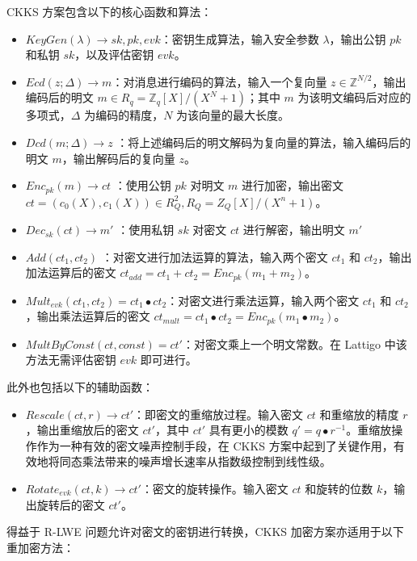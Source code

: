 CKKS 方案包含以下的核心函数和算法：

\begin{itemize}
    \item $KeyGen(\lambda) \rightarrow sk, pk, evk$：密钥生成算法，输入安全参数 $\lambda$，输出公钥 $pk$ 和私钥 $sk$，以及评估密钥 $evk$。
    \item $Ecd(z; \Delta) \rightarrow m$：对消息进行编码的算法，输入一个复向量 $z \in \mathbb{Z}^{N/2}$，输出编码后的明文 $m \in R_q = \mathbb{Z}_q[X]/(X^N+1)$；其中 $m$ 为该明文编码后对应的多项式，$\Delta$ 为编码的精度，$N$ 为该向量的最大长度。
    \item $Dcd(m; \Delta) \rightarrow z$ ：将上述编码后的明文解码为复向量的算法，输入编码后的明文 $m$，输出解码后的复向量 $z$。
    \item $Enc_{pk}(m) \rightarrow ct$ ：使用公钥 $pk$ 对明文 $m$ 进行加密，输出密文 $ct = (c_0(X),c_1(X)) \in R_Q^2, R_Q = Z_Q[X]/(X^n + 1)$。
    \item $Dec_{sk}(ct) \rightarrow m'$ ：使用私钥 $sk$ 对密文 $ct$ 进行解密，输出明文 $m'$
    \item $Add(ct_1, ct_2)$ ：对密文进行加法运算的算法，输入两个密文 $ct_1$ 和 $ct_2$，输出加法运算后的密文 $ct_{add} = ct_1 + ct_2 = Enc_{pk}(m_1 + m_2)$。
    \item $Mult_{evk}(ct_1, ct_2) = ct_1 \bullet ct_2$：对密文进行乘法运算，输入两个密文 $ct_1$ 和 $ct_2$，输出乘法运算后的密文 $ct_{mult} = ct_1 \bullet ct_2 = Enc_{pk}(m_1 \bullet m_2)$。
    \item $MultByConst(ct, const) = ct'$：对密文乘上一个明文常数。在 Lattigo 中该方法无需评估密钥 $evk$ 即可进行。\cite{lattigoRepo}
\end{itemize}

此外也包括以下的辅助函数：

\begin{itemize}
    \item $Rescale(ct, r) \rightarrow ct'$：即密文的重缩放过程。输入密文 $ct$ 和重缩放的精度 $r$，输出重缩放后的密文 $ct'$，其中 $ct'$ 具有更小的模数 $q' = q \bullet r^{-1}$。重缩放操作作为一种有效的密文噪声控制手段，在 CKKS 方案中起到了关键作用，有效地将同态乘法带来的噪声增长速率从指数级控制到线性级。
    \item $Rotate_{evk}(ct, k) \rightarrow ct'$：密文的旋转操作。输入密文 $ct$ 和旋转的位数 $k$，输出旋转后的密文 $ct'$。
\end{itemize}

得益于 R-LWE 问题允许对密文的密钥进行转换\cite{brakerski2014leveled}，CKKS 加密方案亦适用于以下重加密方法：

